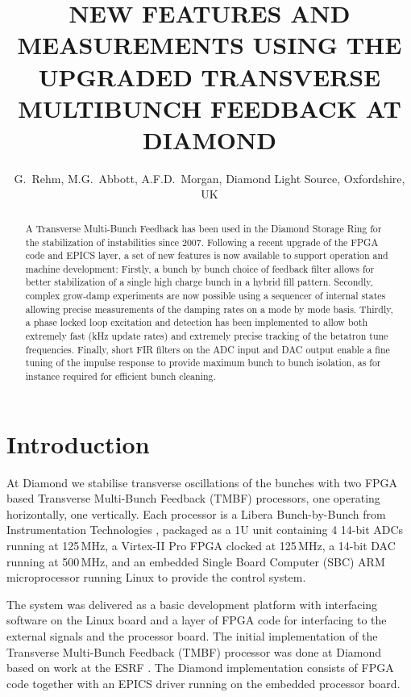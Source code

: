 \documentclass[a4paper]{jacow}
\begin{document}
\title{NEW FEATURES AND MEASUREMENTS USING THE UPGRADED TRANSVERSE MULTIBUNCH FEEDBACK AT DIAMOND}

\author{G.~Rehm, M.G.~Abbott, A.F.D.~Morgan,
    Diamond Light Source, Oxfordshire, UK}

\maketitle

\begin{abstract}

A Transverse Multi-Bunch Feedback has been used in the Diamond Storage Ring for the stabilization of instabilities since 2007. Following a recent upgrade of the FPGA code and EPICS layer, a set of new features is now available to support operation and machine development: Firstly, a bunch by bunch choice of feedback filter allows for better stabilization of a single high charge bunch in a hybrid fill pattern. Secondly, complex grow-damp experiments are now possible using a sequencer of internal states allowing precise measurements of the damping rates on a mode by mode basis. Thirdly, a phase locked loop excitation and detection has been implemented to allow both extremely fast (kHz update rates) and extremely precise tracking of the betatron tune frequencies. Finally, short FIR filters on the ADC input and DAC output enable a fine tuning of the impulse response to provide maximum bunch to bunch isolation, as for instance required for efficient bunch cleaning.

\end{abstract}


\section{Introduction}

At Diamond we stabilise transverse oscillations of the bunches with two FPGA
based Transverse Multi-Bunch Feedback (TMBF) processors, one operating
horizontally, one vertically.  Each processor is a Libera Bunch-by-Bunch from
Instrumentation Technologies \cite{libera}, packaged as a 1U unit containing 4
14-bit ADCs running at 125\,MHz, a Virtex-II Pro FPGA clocked at 125\,MHz, a
14-bit DAC running at 500\,MHz, and an embedded Single Board Computer (SBC) ARM
microprocessor running Linux to provide the control system.

The system was delivered as a basic development platform with interfacing
software on the Linux board and a layer of FPGA code for interfacing to the
external signals and the processor board.  The initial implementation of the
Transverse Multi-Bunch Feedback (TMBF) processor was done at Diamond
\cite{early-tmbf} based on work at the ESRF \cite{esrf}.  The Diamond
implementation consists of FPGA code together with an EPICS driver running on
the embedded processor board.
\end{document}
